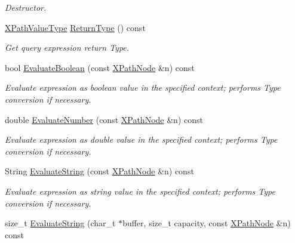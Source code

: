 \begin{DoxyCompactItemize}
\begin{DoxyCompactList}\small\item\em Destructor. \item\end{DoxyCompactList}\item 
\hyperlink{namespacephys_1_1xml_a339b9eef674ba44100110e5524bc575d}{XPathValueType} \hyperlink{classphys_1_1xml_1_1XPathQuery_af4c6025009b1e09cdf56124a047ca4f0}{ReturnType} () const 
\begin{DoxyCompactList}\small\item\em Get query expression return Type. \item\end{DoxyCompactList}\item 
bool \hyperlink{classphys_1_1xml_1_1XPathQuery_a44fed594a458aa4b6cf4f3d12d5089a8}{EvaluateBoolean} (const \hyperlink{classphys_1_1xml_1_1XPathNode}{XPathNode} \&n) const 
\begin{DoxyCompactList}\small\item\em Evaluate expression as boolean value in the specified context; performs Type conversion if necessary. \item\end{DoxyCompactList}\item 
double \hyperlink{classphys_1_1xml_1_1XPathQuery_aacfcff30901ce20b92de56ec0e2d70e5}{EvaluateNumber} (const \hyperlink{classphys_1_1xml_1_1XPathNode}{XPathNode} \&n) const 
\begin{DoxyCompactList}\small\item\em Evaluate expression as double value in the specified context; performs Type conversion if necessary. \item\end{DoxyCompactList}\item 
String \hyperlink{classphys_1_1xml_1_1XPathQuery_ab7084be2e608b38872167fe3321554b9}{EvaluateString} (const \hyperlink{classphys_1_1xml_1_1XPathNode}{XPathNode} \&n) const 
\begin{DoxyCompactList}\small\item\em Evaluate expression as string value in the specified context; performs Type conversion if necessary. \item\end{DoxyCompactList}\item 
size\_\-t \hyperlink{classphys_1_1xml_1_1XPathQuery_ac9f4705c639cbd7f3aef8266fa683cc2}{EvaluateString} (char\_\-t $\ast$buffer, size\_\-t capacity, const \hyperlink{classphys_1_1xml_1_1XPathNode}{XPathNode} \&n) const 

\end{DoxyCompactItemize}
